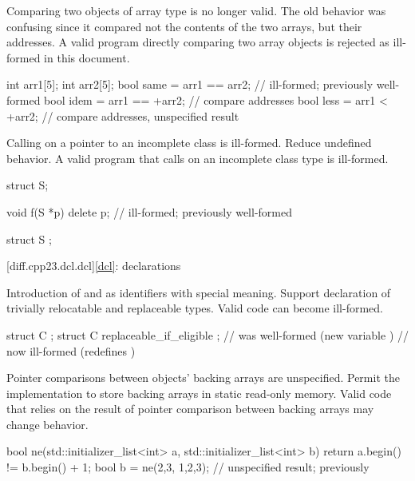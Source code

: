\change
Comparing two objects of array type is no longer valid.
\rationale
The old behavior was confusing since it compared not the contents of the two
arrays, but their addresses.
\effect
A valid \CppXXIII{} program directly comparing two array objects is rejected as
ill-formed in this document.
\begin{example}
\begin{codeblock}
int arr1[5];
int arr2[5];
bool same = arr1 == arr2;       // ill-formed; previously well-formed
bool idem = arr1 == +arr2;      // compare addresses
bool less = arr1 < +arr2;       // compare addresses, unspecified result
\end{codeblock}
\end{example}

\change
Calling  on a pointer to an incomplete class is ill-formed.
\rationale
Reduce undefined behavior.
\effect
A valid \CppXXIII{} program that calls  on an incomplete
class type is ill-formed.
\begin{example}
\begin{codeblock}
struct S;

void f(S *p) {
  delete p;             // ill-formed; previously well-formed
}

struct S {};
\end{codeblock}
\end{example}

[diff.cpp23.dcl.dcl]{\ref{dcl}: declarations}

\change
Introduction of  and
 as identifiers with special meaning.
\rationale
Support declaration of trivially relocatable and replaceable types.
\effect
Valid \CppXXIII{} code can become ill-formed.
\begin{example}
\begin{codeblock}
struct C {};
struct C replaceable_if_eligible {};    // was well-formed (new variable )
                                        // now ill-formed (redefines )
\end{codeblock}
\end{example}

\change
Pointer comparisons between  objects' backing arrays
are unspecified.
\rationale
Permit the implementation to store backing arrays in static read-only memory.
\effect
Valid \CppXXIII{} code
that relies on the result of pointer comparison between backing arrays
may change behavior.
\begin{example}
\begin{codeblock}
bool ne(std::initializer_list<int> a, std::initializer_list<int> b) {
  return a.begin() != b.begin() + 1;
}
bool b = ne({2,3}, {1,2,3});    // unspecified result; previously 
\end{codeblock}
\end{example}

